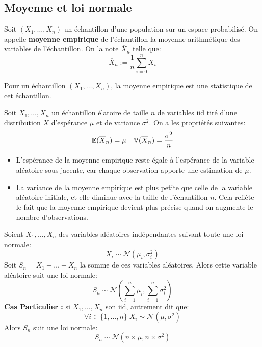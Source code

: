 \subsection{Moyenne et loi normale}

\begin{definition}
    Soit  $(X_1, \dots, X_n)$ un échantillon d'une population sur un espace probabilisé. 
    On appelle \textbf{moyenne empirique} de l'échantillon la moyenne arithmétique des variables de l'échantillon. 
    On la note $\overline{X}_n$ telle que: 
        \[ \overline{X}_n := \frac{1}{n} \sum_{i=0}^{n} X_i \]
\end{definition}

\begin{example}
    Pour un échantillon $(X_1, \dots, X_n)$, la moyenne empirique est une statistique de cet échantillon. 
\end{example}

\begin{proposition}
    Soit $X_1, \dots, X_n$ un échantillon élatoire de taille $n$ de variables iid tiré 
    d'une distribution $X$ d'espérance $\mu$ et de variance $\sigma^2$. On a les propriétés suivantes: 
        \[ \mathbb{E}(\overline{X}_n) = \mu \quad \mathbb{V}(\overline{X}_n) = \frac{\sigma^2}{n} \]  
\end{proposition}

\begin{itemize}
    \item L'espérance de la moyenne empirique reste égale à 
    l'espérance de la variable aléatoire sous-jacente, car chaque observation apporte une estimation de $\mu$.
    \item La variance de la moyenne empirique est plus petite que celle de la variable aléatoire initiale, 
    et elle diminue avec la taille de l'échantillon $n$. 
    Cela reflète le fait que la moyenne empirique devient plus précise quand on augmente le nombre d'observations. 
\end{itemize}

\begin{theorem}
    Soient $X_1, \dots, X_n$ des variables aléatoires indépendantes suivant toute une loi normale: 
        \[ X_i \sim \mathcal{N}(\mu_i, \sigma_i^2) \] 
    Soit $S_n = X_1 + \dots + X_n$ la somme de ces variables aléatoires. Alors cette variable aléatoire suit 
    une loi normale: 
        \[ S_n \sim \mathcal{N}(\sum_{i=1}^{n} \mu_i, \sum_{i=1}^{n} \sigma_i^2) \] 
    \textbf{Cas Particulier :} si $X_1, \dots, X_n$ son iid, autrement dit que: 
        \[ \forall i \in \{1, \dots, n\} \; X_i \sim \mathcal{N}(\mu, \sigma^2) \] 
    Alors $S_n$ suit une loi normale: 
        \[ S_n \sim \mathcal{N}(n \times \mu, n \times \sigma^2) \]
\end{theorem}

